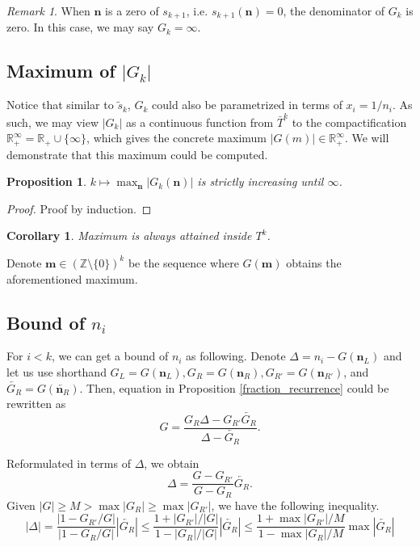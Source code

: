 \documentclass{article}
\theoremstyle{definition}
\theoremstyle{plain}
\newtheorem{corollary}[theorem]{Corollary}
\newtheorem{proposition}{Proposition}[section]
\theoremstyle{remark}
\newtheorem*{remark}{Remark}
\numberwithin{equation}{section}
\newcommand{\integer}{\mathbb{Z}}
\newcommand{\real}{\mathbb{R}}
\newcommand{\abs}[1]{\left\lvert{#1}\right\rvert}
\begin{document}
\begin{remark}
  When $\mathbf{n}$ is a zero of $s_{k+1}$, i.e. $s_{k+1}(\mathbf{n}) = 0$,
  the denominator of $G_k$ is zero. In this case, we may say $G_k = \infty$.
\end{remark}

\subsection{Maximum of $\abs{G_k}$}

Notice that similar to $\tilde{s}_k$,
$G_k$ could also be parametrized in terms of $x_i = 1 / n_i$.
As such, we may view $\abs{G_k}$ as a continuous function
from $\bar{T}^{k}$ to the compactification $\real_{+}^\infty = \real_{+} \cup \{ \infty \}$,
which gives the concrete maximum $\abs{G(m)} \in \real_{+}^\infty$.
We will demonstrate that this maximum could be computed.

\begin{proposition}
  $k \mapsto \max_{\mathbf{n}} \abs{G_k(\mathbf{n})}$ is strictly increasing until $\infty$.
\end{proposition}
\begin{proof}
  Proof by induction.
\end{proof}

\begin{corollary}
  Maximum is always attained inside $T^k$.
\end{corollary}

Denote $\mathbf{m} \in (\integer \setminus \{ 0 \})^k$
be the sequence where $G(\mathbf{m})$ obtains the aforementioned maximum.

\subsection{Bound of $n_i$}

For $i < k$, we can get a bound of $n_i$ as following.
Denote $\Delta = n_i - G(\mathbf{n}_L)$ and let us use shorthand
$G_L = G(\mathbf{n}_L), G_R = G(\mathbf{n}_R),
G_{R'} = G(\mathbf{n}_{R'})$, and $\overleftarrow{G_R} = G(\overleftarrow{\mathbf{n}_R})$.
Then, equation in Proposition \ref{fraction_recurrence} could be rewritten as
\[
  G = \frac{G_R \Delta - G_{R'} \overleftarrow{G_R}}{\Delta - \overleftarrow{G_R}}.
\]

Reformulated in terms of $\Delta$, we obtain
\[
  \Delta = \frac{G - G_{R'}}{G - G_R} \overleftarrow{G_R}.
\]
Given $|G| \geq M > \max \abs{G_R} \geq \max \abs{G_{R'}}$, we have the following inequality.
\[
  |\Delta| = \frac{\abs{1 - G_{R'} / G}}{\abs{1 - G_R / G}} \abs{\overleftarrow{G_R}}
  \leq \frac{1 + \abs{G_{R'}} / \abs{G}}{1 - \abs{G_R} / \abs{G}} \abs{\overleftarrow{G_R}}
  \leq \frac{1 + \max \abs{G_{R'}} / M}{1 - \max \abs{G_R} / M} \max \abs{\overleftarrow{G_R}}
\]
\end{document}
